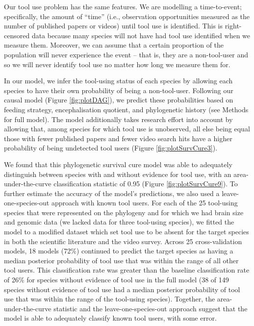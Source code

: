 \documentclass[
  man, donotrepeattitle,floatsintext]{apa6}
\begin{document}
Our tool use problem has the same features. We are modelling a time-to-event;
specifically, the amount of ``time'' (i.e., observation opportunities measured as
the number of published papers or videos) until tool use is identified. This is
right-censored data because many species will not have had tool use identified
when we measure them. Moreover, we can assume that a certain proportion of the
population will never experience the event -- that is, they are a non-tool-user
and so we will never identify tool use no matter how long we measure them for.

In our model, we infer the tool-using status of each species by allowing each
species to have their own probability of being a non-tool-user. Following our
causal model (Figure \ref{fig:plotDAG}), we predict these probabilities based
on feeding strategy, encephalisation quotient, and phylogenetic history (see
Methods for full model). The model additionally takes research effort into
account by allowing that, among species for which tool use is unobserved, all
else being equal those with fewer published papers and fewer video search hits
have a higher probability of being undetected tool users (Figure
\ref{fig:plotSurvCure3}).

We found that this phylogenetic survival cure model was able to adequately
distinguish between species with and without evidence for tool use, with an
area-under-the-curve classification statistic of
0.95 (Figure
\ref{fig:plotSurvCure9}). To further estimate the accuracy of the model's
predictions, we also used a leave-one-species-out approach with known tool
users. For each of the 25 tool-using species that were represented on the
phylogeny and for which we had brain size and genomic data (we lacked data for
three tool-using species), we fitted the model to a modified dataset which set
tool use to be absent for the target species in both the scientific literature
and the video survey. Across 25 cross-validation models,
18 models (72\%)
continued to predict the target species as having a median posterior probability
of tool use that was within the range of all other tool users. This
classification rate was greater than the baseline classification rate of
26\%
for species without evidence of tool use in the full model
(38
of 149 species without
evidence of tool use had a median posterior probability of tool use that was
within the range of the tool-using species). Together, the area-under-the-curve
statistic and the leave-one-species-out approach suggest that the model is able
to adequately classify known tool users, with some error.
\end{document}
